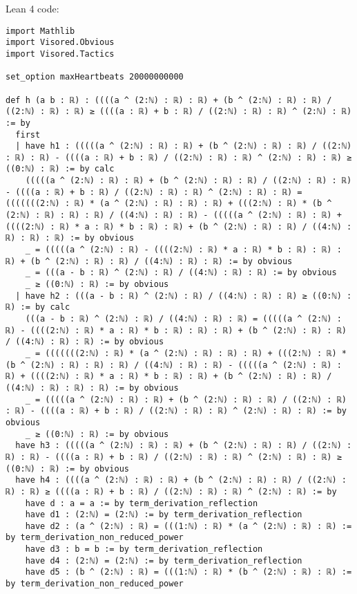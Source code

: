 \documentclass{article}
\begin{document}
Lean 4 code:
\begin{tcolorbox}[colback=white!10, width=\linewidth]
\begin{lstlisting}[language=Lean4]
import Mathlib
import Visored.Obvious
import Visored.Tactics

set_option maxHeartbeats 20000000000

def h (a b : ℝ) : ((((a ^ (2:ℕ) : ℝ) : ℝ) + (b ^ (2:ℕ) : ℝ) : ℝ) / ((2:ℕ) : ℝ) : ℝ) ≥ ((((a : ℝ) + b : ℝ) / ((2:ℕ) : ℝ) : ℝ) ^ (2:ℕ) : ℝ) := by
  first
  | have h1 : (((((a ^ (2:ℕ) : ℝ) : ℝ) + (b ^ (2:ℕ) : ℝ) : ℝ) / ((2:ℕ) : ℝ) : ℝ) - ((((a : ℝ) + b : ℝ) / ((2:ℕ) : ℝ) : ℝ) ^ (2:ℕ) : ℝ) : ℝ) ≥ ((0:ℕ) : ℝ) := by calc
    (((((a ^ (2:ℕ) : ℝ) : ℝ) + (b ^ (2:ℕ) : ℝ) : ℝ) / ((2:ℕ) : ℝ) : ℝ) - ((((a : ℝ) + b : ℝ) / ((2:ℕ) : ℝ) : ℝ) ^ (2:ℕ) : ℝ) : ℝ) = (((((((2:ℕ) : ℝ) * (a ^ (2:ℕ) : ℝ) : ℝ) : ℝ) + (((2:ℕ) : ℝ) * (b ^ (2:ℕ) : ℝ) : ℝ) : ℝ) / ((4:ℕ) : ℝ) : ℝ) - (((((a ^ (2:ℕ) : ℝ) : ℝ) + ((((2:ℕ) : ℝ) * a : ℝ) * b : ℝ) : ℝ) + (b ^ (2:ℕ) : ℝ) : ℝ) / ((4:ℕ) : ℝ) : ℝ) : ℝ) := by obvious
    _ = (((((a ^ (2:ℕ) : ℝ) - ((((2:ℕ) : ℝ) * a : ℝ) * b : ℝ) : ℝ) : ℝ) + (b ^ (2:ℕ) : ℝ) : ℝ) / ((4:ℕ) : ℝ) : ℝ) := by obvious
    _ = (((a - b : ℝ) ^ (2:ℕ) : ℝ) / ((4:ℕ) : ℝ) : ℝ) := by obvious
    _ ≥ ((0:ℕ) : ℝ) := by obvious
  | have h2 : (((a - b : ℝ) ^ (2:ℕ) : ℝ) / ((4:ℕ) : ℝ) : ℝ) ≥ ((0:ℕ) : ℝ) := by calc
    (((a - b : ℝ) ^ (2:ℕ) : ℝ) / ((4:ℕ) : ℝ) : ℝ) = (((((a ^ (2:ℕ) : ℝ) - ((((2:ℕ) : ℝ) * a : ℝ) * b : ℝ) : ℝ) : ℝ) + (b ^ (2:ℕ) : ℝ) : ℝ) / ((4:ℕ) : ℝ) : ℝ) := by obvious
    _ = (((((((2:ℕ) : ℝ) * (a ^ (2:ℕ) : ℝ) : ℝ) : ℝ) + (((2:ℕ) : ℝ) * (b ^ (2:ℕ) : ℝ) : ℝ) : ℝ) / ((4:ℕ) : ℝ) : ℝ) - (((((a ^ (2:ℕ) : ℝ) : ℝ) + ((((2:ℕ) : ℝ) * a : ℝ) * b : ℝ) : ℝ) + (b ^ (2:ℕ) : ℝ) : ℝ) / ((4:ℕ) : ℝ) : ℝ) : ℝ) := by obvious
    _ = (((((a ^ (2:ℕ) : ℝ) : ℝ) + (b ^ (2:ℕ) : ℝ) : ℝ) / ((2:ℕ) : ℝ) : ℝ) - ((((a : ℝ) + b : ℝ) / ((2:ℕ) : ℝ) : ℝ) ^ (2:ℕ) : ℝ) : ℝ) := by obvious
    _ ≥ ((0:ℕ) : ℝ) := by obvious
  have h3 : (((((a ^ (2:ℕ) : ℝ) : ℝ) + (b ^ (2:ℕ) : ℝ) : ℝ) / ((2:ℕ) : ℝ) : ℝ) - ((((a : ℝ) + b : ℝ) / ((2:ℕ) : ℝ) : ℝ) ^ (2:ℕ) : ℝ) : ℝ) ≥ ((0:ℕ) : ℝ) := by obvious
  have h4 : ((((a ^ (2:ℕ) : ℝ) : ℝ) + (b ^ (2:ℕ) : ℝ) : ℝ) / ((2:ℕ) : ℝ) : ℝ) ≥ ((((a : ℝ) + b : ℝ) / ((2:ℕ) : ℝ) : ℝ) ^ (2:ℕ) : ℝ) := by
    have d : a = a := by term_derivation_reflection
    have d1 : (2:ℕ) = (2:ℕ) := by term_derivation_reflection
    have d2 : (a ^ (2:ℕ) : ℝ) = (((1:ℕ) : ℝ) * (a ^ (2:ℕ) : ℝ) : ℝ) := by term_derivation_non_reduced_power
    have d3 : b = b := by term_derivation_reflection
    have d4 : (2:ℕ) = (2:ℕ) := by term_derivation_reflection
    have d5 : (b ^ (2:ℕ) : ℝ) = (((1:ℕ) : ℝ) * (b ^ (2:ℕ) : ℝ) : ℝ) := by term_derivation_non_reduced_power

\end{lstlisting}
\end{tcolorbox}
\end{document}
